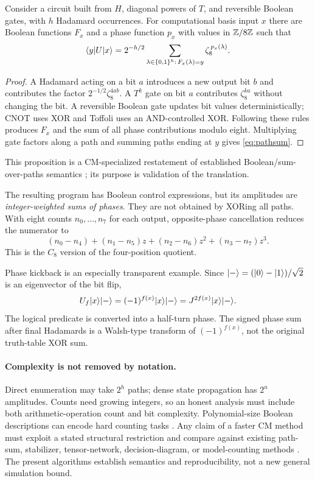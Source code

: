 \begin{proposition}\label{thm:paths}
Consider a circuit built from $H$, diagonal powers of $T$, and reversible Boolean gates, with $h$ Hadamard occurrences. For computational basis input $x$ there are Boolean functions $F_x$ and a phase function $p_x$ with values in $\mathbb Z/8\mathbb Z$ such that
\begin{equation}\label{eq:pathsum}
 \langle y\rvert U\lvert x\rangle=2^{-h/2}
 \sum_{\lambda\in\{0,1\}^h:\,F_x(\lambda)=y}
 \zeta_8^{\,p_x(\lambda)}.
\end{equation}
\end{proposition}
\begin{proof}
A Hadamard acting on a bit $a$ introduces a new output bit $b$ and contributes the factor $2^{-1/2}\zeta_8^{4ab}$. A $T^k$ gate on bit $a$ contributes $\zeta_8^{ka}$ without changing the bit. A reversible Boolean gate updates bit values deterministically; CNOT uses XOR and Toffoli uses an AND-controlled XOR. Following these rules produces $F_x$ and the sum of all phase contributions modulo eight. Multiplying gate factors along a path and summing paths ending at $y$ gives \cref{eq:pathsum}.
\end{proof}
This proposition is a CM-specialized restatement of established Boolean/sum-over-paths semantics \cite{dawson,amy2019,amy2023}; its purpose is validation of the translation.

The resulting program has Boolean control expressions, but its amplitudes are \emph{integer-weighted sums of phases}. They are not obtained by XORing all paths. With eight counts $n_0,\ldots,n_7$ for each output, opposite-phase cancellation reduces the numerator to
\begin{equation}
 (n_0-n_4)+(n_1-n_5)z+(n_2-n_6)z^2+(n_3-n_7)z^3.
\end{equation}
This is the $C_8$ version of the four-position quotient.

Phase kickback is an especially transparent example. Since $\lvert -\rangle=(\lvert 0\rangle-\lvert 1\rangle)/\sqrt2$ is an eigenvector of the bit flip,
\begin{equation}
 U_f\lvert x\rangle\lvert -\rangle=(-1)^{f(x)}\lvert x\rangle\lvert -\rangle=J^{2f(x)}\lvert x\rangle\lvert -\rangle.
\end{equation}
The logical predicate is converted into a half-turn phase. The signed phase sum after final Hadamards is a Walsh-type transform of $(-1)^{f(x)}$, not the original truth-table XOR sum.

\paragraph{Complexity is not removed by notation.}
Direct enumeration may take $2^h$ paths; dense state propagation has $2^n$ amplitudes. Counts need growing integers, so an honest analysis must include both arithmetic-operation count and bit complexity. Polynomial-size Boolean descriptions can encode hard counting tasks \cite{dawson}. Any claim of a faster CM method must exploit a stated structural restriction and compare against existing path-sum, stabilizer, tensor-network, decision-diagram, or model-counting methods \cite{aaronson,markov,tdd,mei}. The present algorithms establish semantics and reproducibility, not a new general simulation bound.

